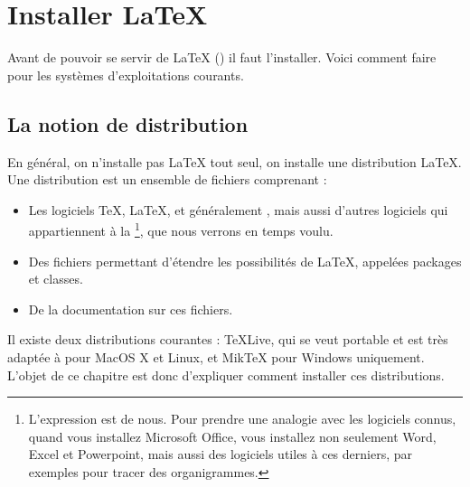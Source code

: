 \chapter {Installer \LaTeX{}}\label{install}

\begin{prealable}
	Avant de pouvoir se servir de \LaTeX{} (\XeLaTeX) il faut l'installer. Voici comment faire pour les systèmes d'exploitations courants.
\end{prealable}

\section{La notion de distribution}

En général, on n'installe pas \LaTeX{} tout seul, on installe une distribution \LaTeX{}. Une distribution est un ensemble de fichiers comprenant :
\begin{itemize}
\item Les logiciels \TeX, \LaTeX, et généralement \XeLaTeX, mais aussi d'autres logiciels qui appartiennent à la  \footnote{L'expression est de nous. Pour prendre une analogie avec les logiciels connus, quand vous installez Microsoft Office, vous installez non seulement Word, Excel et Powerpoint, mais aussi des logiciels utiles à ces derniers, par exemples pour tracer des organigrammes.}, que nous verrons en temps voulu.
\item Des fichiers permettant d'étendre les possibilités de \LaTeX, appelées packages et classes.
\item De la documentation sur ces fichiers.
\end{itemize}

Il existe deux distributions courantes : TeXLive, qui se veut portable et est très adaptée à pour MacOS X et Linux, et MikTeX pour Windows uniquement. L'objet de ce chapitre est donc d'expliquer comment installer ces distributions.




